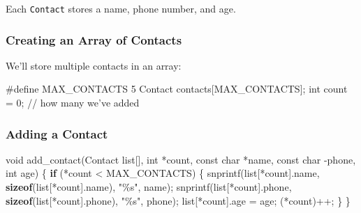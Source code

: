 \documentclass[
  letterpaper,
  DIV=11,
  numbers=noendperiod]{scrreprt}
\newenvironment{Shaded}{\begin{snugshade}}{\end{snugshade}}
\newcommand{\CommentTok}[1]{\textcolor[rgb]{0.37,0.37,0.37}{#1}}
\newcommand{\ControlFlowTok}[1]{\textcolor[rgb]{0.00,0.23,0.31}{\textbf{#1}}}
\newcommand{\DataTypeTok}[1]{\textcolor[rgb]{0.68,0.00,0.00}{#1}}
\newcommand{\DecValTok}[1]{\textcolor[rgb]{0.68,0.00,0.00}{#1}}
\newcommand{\KeywordTok}[1]{\textcolor[rgb]{0.00,0.23,0.31}{\textbf{#1}}}
\newcommand{\NormalTok}[1]{\textcolor[rgb]{0.00,0.23,0.31}{#1}}
\newcommand{\OperatorTok}[1]{\textcolor[rgb]{0.37,0.37,0.37}{#1}}
\newcommand{\PreprocessorTok}[1]{\textcolor[rgb]{0.68,0.00,0.00}{#1}}
\newcommand{\SpecialCharTok}[1]{\textcolor[rgb]{0.37,0.37,0.37}{#1}}
\newcommand{\StringTok}[1]{\textcolor[rgb]{0.13,0.47,0.30}{#1}}
\begin{document}
Each \texttt{Contact} stores a name, phone number, and age.

\subsubsection{Creating an Array of
Contacts}\label{creating-an-array-of-contacts}

We'll store multiple contacts in an array:

\begin{Shaded}
\begin{Highlighting}[]
\PreprocessorTok{\#define MAX\_CONTACTS }\DecValTok{5}
\NormalTok{Contact contacts}\OperatorTok{[}\NormalTok{MAX\_CONTACTS}\OperatorTok{];}
\DataTypeTok{int}\NormalTok{ count }\OperatorTok{=} \DecValTok{0}\OperatorTok{;}  \CommentTok{// how many we’ve added}
\end{Highlighting}
\end{Shaded}

\subsubsection{Adding a Contact}\label{adding-a-contact}

\begin{Shaded}
\begin{Highlighting}[]
\DataTypeTok{void}\NormalTok{ add\_contact}\OperatorTok{(}\NormalTok{Contact list}\OperatorTok{[],} \DataTypeTok{int} \OperatorTok{*}\NormalTok{count}\OperatorTok{,} \DataTypeTok{const} \DataTypeTok{char} \OperatorTok{*}\NormalTok{name}\OperatorTok{,} \DataTypeTok{const} \DataTypeTok{char} \OperatorTok{{-}}\NormalTok{phone}\OperatorTok{,} \DataTypeTok{int}\NormalTok{ age}\OperatorTok{)} \OperatorTok{\{}
    \ControlFlowTok{if} \OperatorTok{(*}\NormalTok{count }\OperatorTok{\textless{}}\NormalTok{ MAX\_CONTACTS}\OperatorTok{)} \OperatorTok{\{}
\NormalTok{        snprintf}\OperatorTok{(}\NormalTok{list}\OperatorTok{[*}\NormalTok{count}\OperatorTok{].}\NormalTok{name}\OperatorTok{,} \KeywordTok{sizeof}\OperatorTok{(}\NormalTok{list}\OperatorTok{[*}\NormalTok{count}\OperatorTok{].}\NormalTok{name}\OperatorTok{),} \StringTok{"}\SpecialCharTok{\%s}\StringTok{"}\OperatorTok{,}\NormalTok{ name}\OperatorTok{);}
\NormalTok{        snprintf}\OperatorTok{(}\NormalTok{list}\OperatorTok{[*}\NormalTok{count}\OperatorTok{].}\NormalTok{phone}\OperatorTok{,} \KeywordTok{sizeof}\OperatorTok{(}\NormalTok{list}\OperatorTok{[*}\NormalTok{count}\OperatorTok{].}\NormalTok{phone}\OperatorTok{),} \StringTok{"}\SpecialCharTok{\%s}\StringTok{"}\OperatorTok{,}\NormalTok{ phone}\OperatorTok{);}
\NormalTok{        list}\OperatorTok{[*}\NormalTok{count}\OperatorTok{].}\NormalTok{age }\OperatorTok{=}\NormalTok{ age}\OperatorTok{;}
        \OperatorTok{(*}\NormalTok{count}\OperatorTok{)++;}
    \OperatorTok{\}}
\OperatorTok{\}}
\end{Highlighting}
\end{Shaded}
\end{document}
